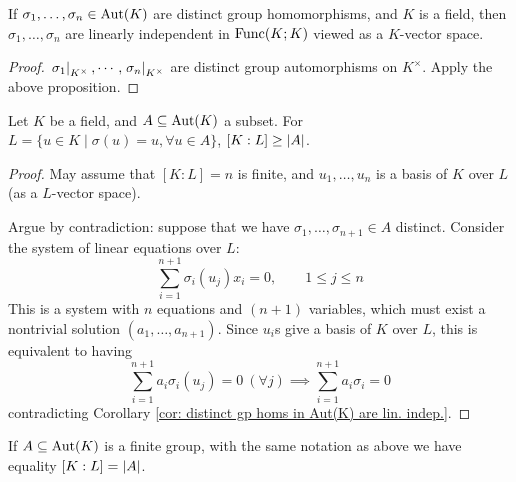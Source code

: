 \documentclass{article}
\begin{document}
\begin{corollary}\label{cor: distinct gp homs in Aut(K) are lin. indep.}
    If $\sigma_1, \dots, \sigma_n \in \mathrm{Aut}(K)$ are distinct group homomorphisms, and $K$ is a field, then $\sigma_1, \dots, \sigma_n$ are linearly independent in $\mathrm{Func}(K; K)$ viewed as a $K$-vector space.
\end{corollary}

\begin{proof}
    $\left.\sigma_1\right|_{K^{\times}}, \cdots, \left.\sigma_n\right|_{K^{\times}}$ are distinct group automorphisms on $K^{\times}$. Apply the above proposition.
\end{proof}

\begin{proposition}
    Let $K$ be a field, and $A \subseteq \mathrm{Aut}(K)$ a subset. For $L = \{u \in K \mid \sigma(u) = u, \forall u \in A\}$, $[K : L] \geq \left|A\right|$.
\end{proposition}

\begin{proof}
    May assume that $[K : L] = n$ is finite, and $u_1, \dots, u_n$ is a basis of $K$ over $L$ (as a $L$-vector space). 

    Argue by contradiction: suppose that we have $\sigma_1, \dots, \sigma_{n+1} \in A$ distinct. Consider the system of linear equations over $L$:
    \[
        \sum_{i = 1}^{n+1} \sigma_i(u_j) x_i = 0, \qquad 1 \leq j \leq n
    \]
    This is a system with $n$ equations and $(n+1)$ variables, which must exist a nontrivial solution $(a_1, \dots, a_{n+1})$. Since $u_i$s give a basis of $K$ over $L$, this is equivalent to having
    \[
        \sum_{i = 1}^{n+1} a_i \sigma_i(u_j) = 0\ (\forall j) \implies \sum_{i = 1}^{n+1} a_i \sigma_i = 0
    \]
    contradicting Corollary \ref{cor: distinct gp homs in Aut(K) are lin. indep.}.
\end{proof}

\begin{proposition}\label{prop: degree of subext equals order of galois subgroup}
    If $A \subseteq \mathrm{Aut}(K)$ is a finite group, with the same notation as above we have equality $[K : L] = \left|A\right|$.
\end{proposition}
\end{document}
